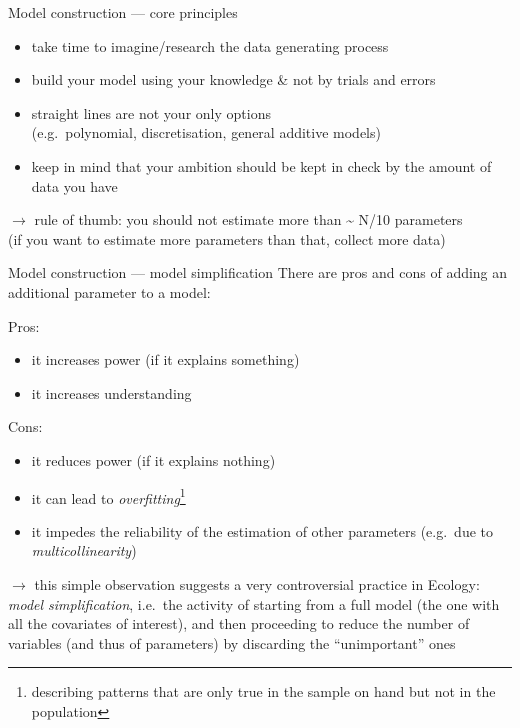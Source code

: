 \documentclass[
  10pt,
  ignorenonframetext,
  aspectratio=169,
  t]{beamer}
\providecommand{\tightlist}{%
  \setlength{\itemsep}{0pt}\setlength{\parskip}{0pt}}
\newcommand{\blueit}[1]{\textcolor{bluebeamer}{\emph{#1}}}
\begin{document}
\begin{frame}[c]{Model construction --- core principles}
\protect{}\label{model-construction-core-principles}
\begin{itemize}
\item
  take time to imagine/research the data generating process
\item
  build your model using your knowledge \& not by trials and errors
\item
  straight lines are not your only options\\
  (e.g.~polynomial, discretisation, general additive models)
\item
  keep in mind that your ambition should be kept in check by the amount
  of data you have
\end{itemize}

\(\rightarrow\) rule of thumb: you should not estimate more than
\textasciitilde{} N/10 parameters\\
(if you want to estimate more parameters than that, collect more data)
\end{frame}

\begin{frame}{Model construction --- model simplification}
\protect{}\label{model-construction-model-simplification}
There are pros and cons of adding an additional parameter to a model:

Pros:

\begin{itemize}
\tightlist
\item
  it increases power (if it explains something)
\item
  it increases understanding
\end{itemize}

\pause

Cons:

\begin{itemize}
\tightlist
\item
  it reduces power (if it explains nothing)
\item
  it can lead to
  \blueit{overfitting}\footnote{describing patterns that are only true in the sample on hand but not in the population}
\item
  it impedes the reliability of the estimation of other parameters
  (e.g.~due to \blueit{multicollinearity})
\end{itemize}

\pause

\(\rightarrow\) this simple observation suggests a very controversial
practice in Ecology: \blueit{model simplification}, i.e.~the activity of
starting from a full model (the one with all the covariates of
interest), and then proceeding to reduce the number of variables (and
thus of parameters) by discarding the ``unimportant'' ones
\end{frame}
\end{document}

